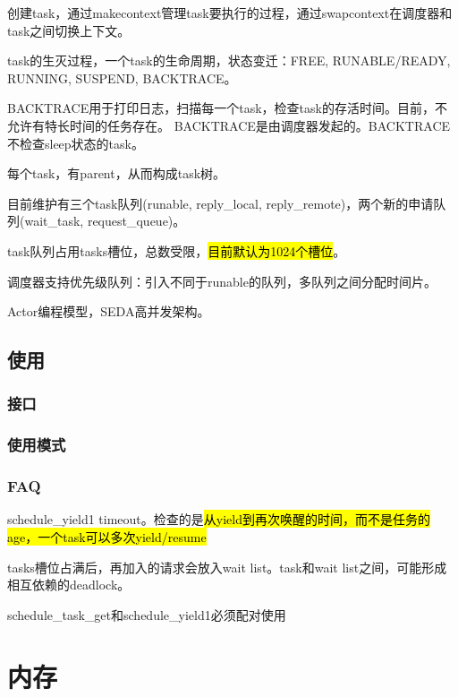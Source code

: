 创建task，通过makecontext管理task要执行的过程，通过swapcontext在调度器和task之间切换上下文。

task的生灭过程，一个task的生命周期，状态变迁：FREE, RUNABLE/READY, RUNNING, SUSPEND, BACKTRACE。

BACKTRACE用于打印日志，扫描每一个task，检查task的存活时间。目前，不允许有特长时间的任务存在。
BACKTRACE是由调度器发起的。BACKTRACE不检查sleep状态的task。

每个task，有parent，从而构成task树。

目前维护有三个task队列(runable, reply\_local, reply\_remote)，两个新的申请队列(wait\_task, request\_queue)。

task队列占用tasks槽位，总数受限，\hl{目前默认为1024个槽位}。

调度器支持优先级队列：引入不同于runable的队列，多队列之间分配时间片。

Actor编程模型，SEDA高并发架构。

\subsection{使用}

\subsubsection{接口}

\subsubsection{使用模式}

\subsubsection{FAQ}

\begin{compactenum}
\item schedule\_yield1 timeout。检查的是\hl{从yield到再次唤醒的时间，而不是任务的age，一个task可以多次yield/resume}
\item tasks槽位占满后，再加入的请求会放入wait list。task和wait list之间，可能形成相互依赖的deadlock。
\item schedule\_task\_get和schedule\_yield1必须配对使用
\end{compactenum}

\section{内存}

